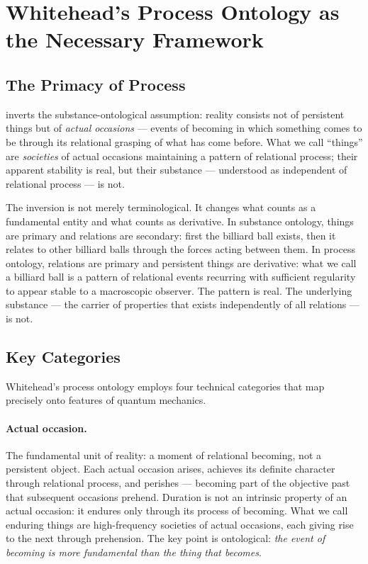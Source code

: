 
\section{Whitehead's Process Ontology as the Necessary Framework}
\label{sec:whitehead}

\subsection{The Primacy of Process}

\citet{Whitehead1929} inverts the substance-ontological assumption:
reality consists not of persistent things but of \emph{actual occasions}
--- events of becoming in which something comes to be through its relational
grasping of what has come before.
What we call ``things'' are \emph{societies} of actual occasions maintaining
a pattern of relational process; their apparent stability is real, but their
substance --- understood as independent of relational process --- is not.

The inversion is not merely terminological.
It changes what counts as a fundamental entity and what counts as derivative.
In substance ontology, things are primary and relations are secondary:
first the billiard ball exists, then it relates to other billiard balls
through the forces acting between them.
In process ontology, relations are primary and persistent things are
derivative: what we call a billiard ball is a pattern of relational
events recurring with sufficient regularity to appear stable to a
macroscopic observer.
The pattern is real.
The underlying substance --- the carrier of properties that exists
independently of all relations --- is not.

\subsection{Key Categories}

Whitehead's process ontology employs four technical categories that map
precisely onto features of quantum mechanics.

\paragraph{Actual occasion.}
The fundamental unit of reality: a moment of relational becoming, not
a persistent object.
Each actual occasion arises, achieves its definite character through
relational process, and perishes --- becoming part of the objective past
that subsequent occasions prehend.
Duration is not an intrinsic property of an actual occasion: it endures
only through its process of becoming.
What we call enduring things are high-frequency societies of actual
occasions, each giving rise to the next through prehension.
The key point is ontological: \emph{the event of becoming is more
fundamental than the thing that becomes}.

